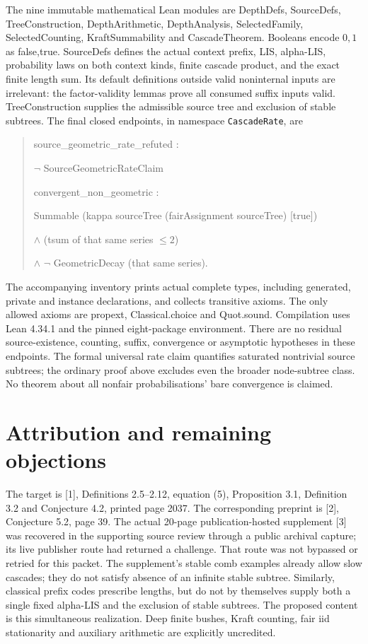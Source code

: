 \documentclass[11pt]{article}
\begin{document}
The nine immutable mathematical Lean modules are DepthDefs, SourceDefs,
TreeConstruction, DepthArithmetic, DepthAnalysis, SelectedFamily,
SelectedCounting, KraftSummability and CascadeTheorem. Booleans encode
$0,1$ as false,true. SourceDefs defines the actual context prefix, LIS,
alpha-LIS, probability laws on both context kinds, finite cascade product,
and the exact finite length sum. Its default definitions outside valid
noninternal inputs are irrelevant: the factor-validity lemmas prove all
consumed suffix inputs valid. TreeConstruction supplies the admissible
source tree and exclusion of stable subtrees. The final closed endpoints,
in namespace \texttt{CascadeRate}, are
\begin{quote}\ttfamily\small
source\_geometric\_rate\_refuted :\par
\quad $\neg$ SourceGeometricRateClaim\par\medskip
convergent\_non\_geometric :\par
\quad Summable (kappa sourceTree (fairAssignment sourceTree) [true])\par
\quad $\land$ (tsum of that same series $\leq 2$)\par
\quad $\land$ $\neg$ GeometricDecay (that same series).
\end{quote}
The accompanying inventory prints actual complete types, including generated,
private and instance declarations, and collects transitive axioms. The only
allowed axioms are propext, Classical.choice and Quot.sound. Compilation uses
Lean 4.34.1 and the pinned eight-package environment. There are no residual
source-existence, counting, suffix, convergence or asymptotic hypotheses in
these endpoints. The formal universal rate claim quantifies saturated
nontrivial source subtrees; the ordinary proof above excludes even the
broader node-subtree class. No theorem about all nonfair probabilisations'
bare convergence is claimed.

\section{Attribution and remaining objections}
The target is [1], Definitions 2.5--2.12, equation (5), Proposition 3.1,
Definition 3.2 and Conjecture 4.2, printed page 2037. The corresponding
preprint is [2], Conjecture 5.2, page 39. The actual 20-page publication-hosted
supplement [3] was recovered in the supporting source review through a
public archival capture; its live publisher route had returned a challenge.
That route was not bypassed or retried for this packet.
\newpage
The supplement's stable comb examples already allow slow cascades; they do
not satisfy absence of an infinite stable subtree. Similarly, classical
prefix codes prescribe lengths, but do not by themselves supply both a
single fixed alpha-LIS and the exclusion of stable subtrees. The proposed
content is this simultaneous realization. Deep finite bushes, Kraft counting,
fair iid stationarity and auxiliary arithmetic are explicitly uncredited.
\end{document}
